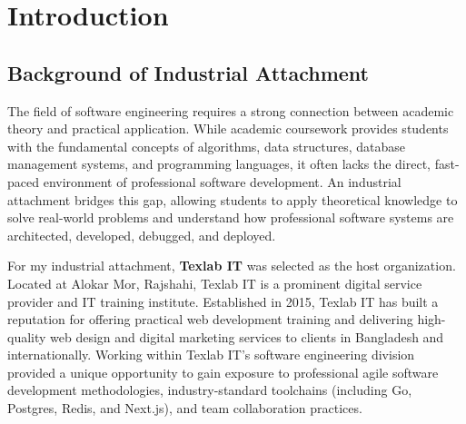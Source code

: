 \chapter{Introduction}

\section{Background of Industrial Attachment}
The field of software engineering requires a strong connection between academic theory and practical application. While academic coursework provides students with the fundamental concepts of algorithms, data structures, database management systems, and programming languages, it often lacks the direct, fast-paced environment of professional software development. An industrial attachment bridges this gap, allowing students to apply theoretical knowledge to solve real-world problems and understand how professional software systems are architected, developed, debugged, and deployed.

For my industrial attachment, \textbf{Texlab IT} was selected as the host organization. Located at Alokar Mor, Rajshahi, Texlab IT is a prominent digital service provider and IT training institute. Established in 2015, Texlab IT has built a reputation for offering practical web development training and delivering high-quality web design and digital marketing services to clients in Bangladesh and internationally. Working within Texlab IT's software engineering division provided a unique opportunity to gain exposure to professional agile software development methodologies, industry-standard toolchains (including Go, Postgres, Redis, and Next.js), and team collaboration practices.

